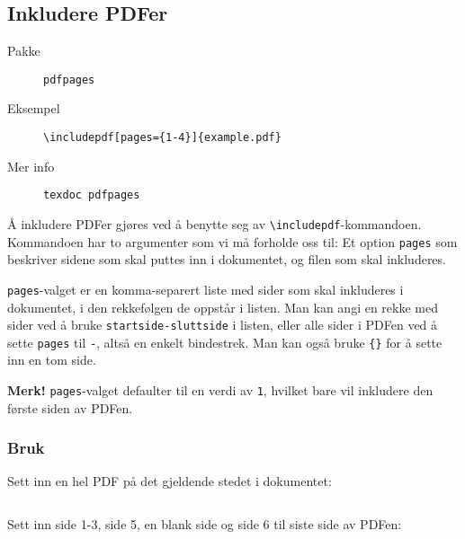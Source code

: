 \subsection{Inkludere PDFer}
\label{pkg:pdfpages}
\begin{description}
    \item[Pakke] \texttt{pdfpages}
    \item[Eksempel] \texttt{\textbackslash includepdf[pages=\{1-4\}]\{example.pdf\}}
    \item[Mer info] \texttt{texdoc pdfpages}
\end{description}

Å inkludere PDFer gjøres ved å benytte seg av \texttt{\textbackslash includepdf}-kommandoen.
Kommandoen har to argumenter som vi må forholde oss til: Et option \texttt{pages} som beskriver sidene som skal puttes inn i dokumentet, og filen som skal inkluderes.

\texttt{pages}-valget er en komma-separert liste med sider som skal inkluderes i dokumentet, i den rekkefølgen de oppstår i listen.
Man kan angi en rekke med sider ved å bruke \texttt{startside-sluttside} i listen, eller alle sider i PDFen ved å sette \texttt{pages} til \texttt{-}, altså en enkelt bindestrek.
Man kan også bruke \texttt{\{\}} for å sette inn en tom side.

\textbf{Merk!} \texttt{pages}-valget defaulter til en verdi av \texttt{1}, hvilket bare vil inkludere den første siden av PDFen.

\subsubsection*{Bruk}
Sett inn en hel PDF på det gjeldende stedet i dokumentet:
\vspace{0.75em}
\begin{lstlisting}

\end{lstlisting}
\vspace{1.5em}

Sett inn side 1-3, side 5, en blank side og side 6 til siste side av PDFen:
\vspace{0.75em}
\begin{lstlisting}

\end{lstlisting}
\vspace{1.5em}
